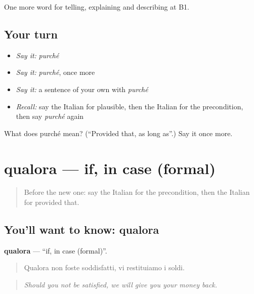 \begin{grammarlens}[title={What you've built}]
One more word for telling, explaining and describing at B1.
\end{grammarlens}

\subsection*{Your turn}
\begin{itemize}
\raggedright
  \item \emph{Say it:} \emph{purché}
  \item \emph{Say it:} \emph{purché}, once more
  \item \emph{Say it:} a sentence of your own with \emph{purché}
  \item \emph{Recall:} say the Italian for plausible, then the Italian for the precondition, then say \emph{purché} again
\end{itemize}

\begin{tcolorbox}[breakable,colback=teal!4,colframe=teal!35!black,title={Before you move on}]
What does purché mean? (\textquotedblleft{}Provided that, as long as\textquotedblright{}.) Say it once more.
\end{tcolorbox}
\section[qualora]{qualora — if, in case (formal)}

\label{lesson:IT-C373-qualora}



\begin{quote}
Before the new one: say the Italian for the precondition, then the Italian for provided that.
\end{quote}

\subsection*{You'll want to know: qualora}
\textbf{qualora} — \textquotedblleft{}if, in case (formal)\textquotedblright{}.

\begin{quote}
Qualora non foste soddisfatti, vi restituiamo i soldi.
\end{quote}

\begin{quote}
\emph{Should you not be satisfied, we will give you your money back.}
\end{quote}


